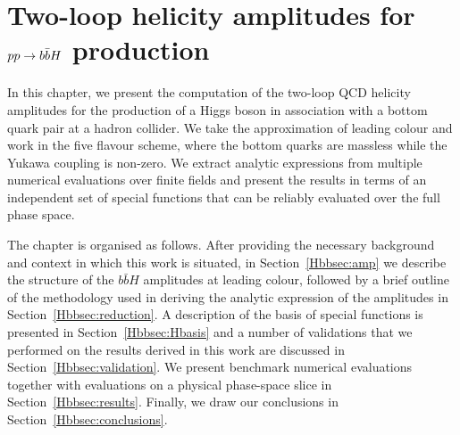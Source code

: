 \documentclass[main.tex]{subfiles}
\begin{document}
\chapter{Two-loop helicity amplitudes for $pp \rightarrow b\bar{b}H$ production} \label{sec:Hbb}
In this chapter, we present the computation of the two-loop QCD helicity amplitudes for the production of a Higgs boson in association with a bottom quark pair at a hadron collider. We take the approximation of leading colour and work in the five flavour scheme, where the bottom quarks are massless while the Yukawa coupling is non-zero. We extract analytic expressions from multiple numerical evaluations over finite fields and present the results in terms of an independent set of special functions that can be reliably evaluated over the full phase space.

The chapter is organised as follows. After providing the necessary background and context in which this work is situated, in Section~\ref{Hbbsec:amp} we describe the structure of the $b\bar{b}H$ amplitudes at leading colour, followed by a brief outline of the methodology used in deriving the analytic expression of the amplitudes in Section~\ref{Hbbsec:reduction}. A description of the basis of special functions is presented in Section~\ref{Hbbsec:Hbasis} and a number of validations that we performed on the results derived in this work are discussed in Section~\ref{Hbbsec:validation}. We present benchmark numerical evaluations together with evaluations on a physical phase-space slice in Section~\ref{Hbbsec:results}. Finally, we draw our conclusions in Section~\ref{Hbbsec:conclusions}. 
\end{document}
